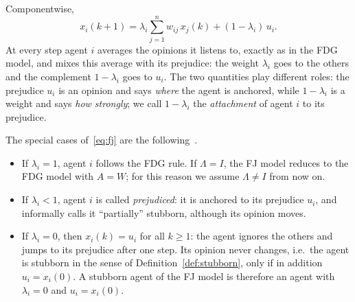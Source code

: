 Componentwise,
\begin{equation}\label{eq:fj-i}
  x_i(k+1) = \lambda_i \sum_{j=1}^{n} w_{ij}\, x_j(k) + (1 - \lambda_i)\, u_i .
\end{equation}
At every step agent $i$ averages the opinions it listens to, exactly as in the FDG
model, and mixes this average with its prejudice: the weight $\lambda_i$ goes to the
others and the complement $1 - \lambda_i$ goes to $u_i$. The two quantities play
different roles: the prejudice $u_i$ is an opinion and says \emph{where} the agent is
anchored, while $1 - \lambda_i$ is a weight and says \emph{how strongly}; we call
$1 - \lambda_i$ the \emph{attachment} of agent $i$ to its prejudice.

The special cases of~\eqref{eq:fj} are the following~\cite{proskurnikov2017tutorial}.
\begin{itemize}
  \item If $\lambda_i = 1$, agent $i$ follows the FDG rule. If $\Lambda = I$, the FJ
        model reduces to the FDG model with $A = W$; for this reason we assume
        $\Lambda \neq I$ from now on.
  \item If $\lambda_i < 1$, agent $i$ is called \emph{prejudiced}: it is anchored to its
        prejudice $u_i$, and~\cite{proskurnikov2017tutorial} informally calls it
        ``partially'' stubborn, although its opinion moves.
  \item If $\lambda_i = 0$, then $x_i(k) = u_i$ for all $k \geq 1$: the agent ignores
        the others and jumps to its prejudice after one step. Its opinion never changes,
        i.e.\ the agent is stubborn in the sense of Definition~\ref{def:stubborn}, only
        if in addition $u_i = x_i(0)$. A stubborn agent of the FJ model is therefore an
        agent with $\lambda_i = 0$ and $u_i = x_i(0)$.
\end{itemize}

